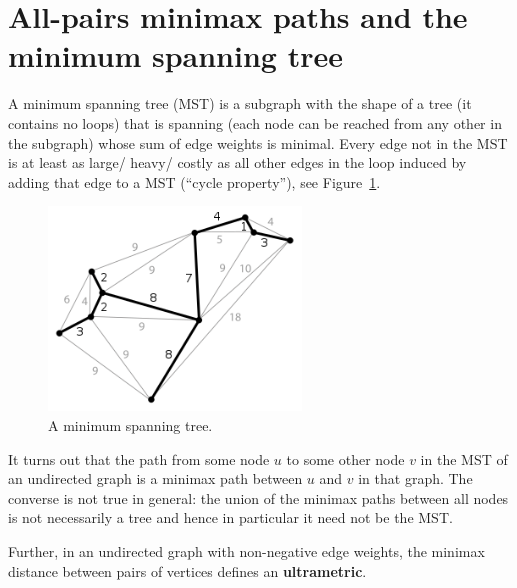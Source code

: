 \section{All-pairs minimax paths and the minimum spanning tree}
A minimum spanning tree (MST) is a subgraph with the shape of a tree
(\ie it contains no loops) that is spanning (\ie each node can be
reached from any other in the subgraph) whose sum of edge weights is
minimal. Every edge not in the MST is at least as large/ heavy/ costly
as all other edges in the loop induced by adding that edge to a MST
(``cycle property''), see Figure~\ref{fig:mst}.
\begin{figure}[htpb]
  \centering \includegraphics[width=0.6\textwidth]{Figures/MST}
  \caption{A minimum spanning tree.}%
  \label{fig:mst}
\end{figure}

It turns out that the path from some node $u$ to some other node $v$
in the MST of an undirected graph is a minimax path between $u$ and
$v$ in that graph. The converse is not true in general: the union of
the minimax paths between all nodes is not necessarily a tree and
hence in particular it need not be the MST.

Further, in an undirected graph with non-negative edge weights, the
minimax distance between pairs of vertices defines an
\textbf{ultrametric}.

